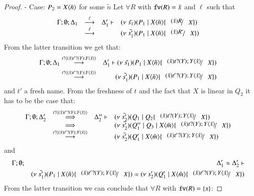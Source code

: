 \begin{proof}
	\noi - Case: $P_2 = X\langle \tilde{n} \rangle$ for some $\tilde{n}$
%
	Let $\forall R$ with $\mathtt{fv}(R) = \tilde{x}$ and $\ell$ such that
\[
	\begin{array}{rcll}
		\Gamma; \es; \Delta_1 &\by{\ell}& \Delta_1' \proves & \newsp{\tilde{s_1}}{P_1 \Par \appl{X}{\tilde{n}} \subst{(\tilde{x}) R}{X}}\\
		&\by{\ell}& &
		\newsp{\tilde{s_1'}}{P_1 \Par \appl{X}{\tilde{n}} \subst{(\tilde{x}) R'}{X}}
	\end{array}
\]
%
	\noi From the latter transition we get that:
%
	\begin{eqnarray}
		\Gamma; \es; \Delta_1 &\by{\bactinp{t}{(\tilde{x}) \binp{t'}{Y} \appl{Y}{\tilde{x}}}}& \Delta_1' \proves \newsp{\tilde{s_1}}{P_1 \Par \appl{X}{\tilde{n}} \subst{(\tilde{x}) \binp{t}{Y} \appl{Y}{\tilde{x}}}{X}} \nonumber \\
		&\by{\bactinp{t}{(\tilde{x}) \binp{t'}{Y} \appl{Y}{\tilde{x}}}}& 
		\newsp{\tilde{s_1'}}{P_1 \Par \appl{X}{\tilde{n}} \subst{(\tilde{x}) \binp{t'}{Y} \appl{Y}{\tilde{x}}}{X}}
		\label{lem:subst_equiv5}
	\end{eqnarray}
%
	\noi and $t'$ a fresh name. From the freshness of $t$ and the fact that $X$ is linear in $Q_2$
	it has to be the case that:
%
\[
	\begin{array}{rcll}
		\Gamma; \es; \Delta_2' &\By{\bactinp{t}{(\tilde{x}) \binp{t'}{Y} \appl{Y}{\tilde{x}}}}& \Delta_2'' \proves &
		\newsp{\tilde{s_2'}}{Q_1 \Par Q_2 \subst{(\tilde{x}) \binp{t}{Y} \appl{Y}{\tilde{x}}}{X}}\\
		&\By{}& &
		\newsp{\tilde{s_2'}}{Q_1'' \Par Q_3 \Par \appl{X}{\tilde{m}} \subst{(\tilde{x})\binp{t}{Y} \appl{Y}{\tilde{x}}}{X}} \\
		&\by{\bactinp{t}{(\tilde{x}) \binp{t'}{Y} \appl{Y}{\tilde{x}}}}& &
		\newsp{\tilde{s_2'}}{Q_1' \Par \appl{X}{\tilde{m}} \subst{(\tilde{x})\binp{t'}{Y} \appl{Y}{\tilde{x}}}{X}} \\
	\end{array}
\]
%
	\noi and
%
	\begin{eqnarray}
		\Gamma; \es; &&\Delta_1' \wb \Delta_2' \proves \nonumber \\
		&&\newsp{\tilde{s_1'}}{P_1 \Par \appl{X}{\tilde{n}} \subst{(\tilde{x}) \binp{t'}{Y} \appl{Y}{\tilde{x}}}{X}} \wb \newsp{s_2'}{Q_1' \Par \appl{X}{\tilde{m}} \subst{(\tilde{x}) \binp{t'}{Y} \appl{Y}{\tilde{x}}}{X}}
		\label{lem:subst_equiv6}
	\end{eqnarray} 
%
	\noi From the latter transition we can conclude that $\forall R$ with $\mathtt{fv}(R) = \{x\}$:

\end{proof}

